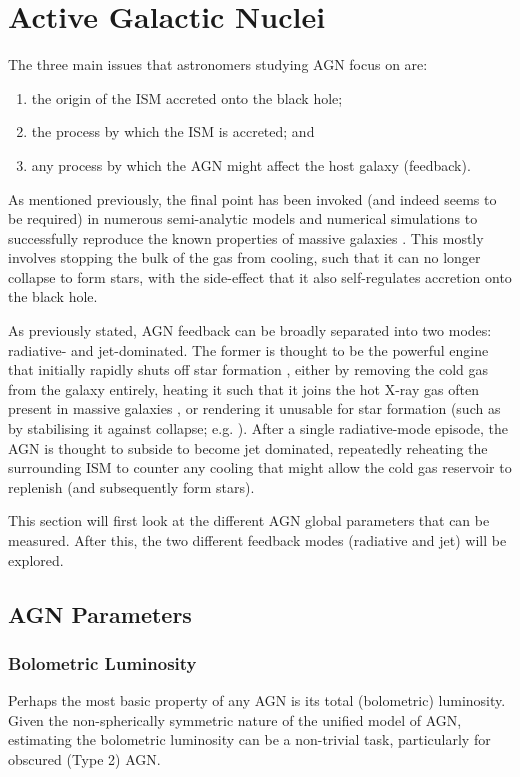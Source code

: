 \section{Active Galactic Nuclei}
	\label{sec:AGN}
	The three main issues that astronomers studying AGN focus on are:
	\begin{enumerate}
		\item the origin of the ISM accreted onto the black hole;
		\item the process by which the ISM is accreted; and
		\item any process by which the AGN might affect the host galaxy (feedback).
	\end{enumerate}
	As mentioned previously, the final point has been invoked (and indeed seems to be required) in numerous semi-analytic models and numerical simulations to successfully reproduce the known properties of massive galaxies \citep[e.g.][etc.]{DiMatteo2005, Bower2006, Springel2005}. This mostly involves stopping the bulk of the gas from cooling, such that it can no longer collapse to form stars, with the side-effect that it also self-regulates accretion onto the black hole.

	As previously stated, AGN feedback can be broadly separated into two modes: radiative- and jet-dominated. The former is thought to be the powerful engine that initially rapidly shuts off star formation \citep[e.g.][]{Thomas2005, Thomas2010}, either by removing the cold gas from the galaxy entirely, heating it such that it joins the hot X-ray gas often present in massive galaxies \citep[e.g.][]{OSullivan2001}, or rendering it unusable for star formation (such as by stabilising it against collapse; e.g. \citealt{Martig2009}). After a single radiative-mode episode, the AGN is thought to subside to become jet dominated, repeatedly reheating the surrounding ISM to counter any cooling that might allow the cold gas reservoir to replenish (and subsequently form stars). 

	This section will first look at the different AGN global parameters that can be measured. After this, the two different feedback modes (radiative and jet) will be explored.

	\subsection{AGN Parameters}
		\label{subsec:AGNparams}

		\subsubsection{Bolometric Luminosity}
			Perhaps the most basic property of any AGN is its total (bolometric) luminosity. Given the non-spherically symmetric nature of the unified model of AGN, estimating the bolometric luminosity can be a non-trivial task, particularly for obscured (Type 2) AGN. 

